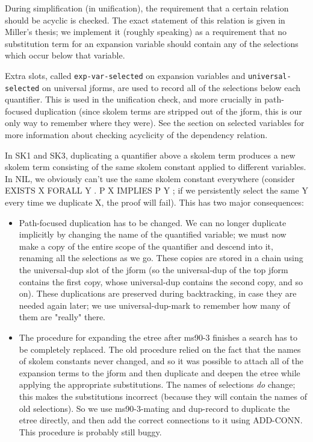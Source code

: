 During simplification (in unification), the requirement that a certain relation should be acyclic
is checked. The exact statement of this relation is given in Miller's thesis; we implement it
(roughly speaking) as a requirement that no substitution term for an expansion variable should 
contain any of the selections which occur below that variable.

Extra slots, called {\tt exp-var-selected} on expansion variables and {\tt universal-selected} on 
universal jforms, are used to record all of the 
selections below each quantifier. This is used in the unification check, and more crucially
in path-focused duplication (since skolem terms are stripped out of the jform, this is our only 
way to remember where they were).  See the section on selected variables for more information
about checking acyclicity of the dependency relation.

In SK1 and SK3, duplicating a quantifier above a skolem term produces a new skolem term 
consisting of the same skolem constant applied to different variables. In NIL, we obviously 
can't use the same skolem constant everywhere (consider EXISTS X FORALL Y . P X IMPLIES P Y ; 
if we persistently select the same Y every time we duplicate X, the proof will fail). This 
has two major consequences:

\begin{itemize}
\item Path-focused duplication has to be changed. We can no longer duplicate implicitly by changing the
name of the quantified variable; we must now make a copy of the entire scope of the 
quantifier and descend into it, renaming all the selections as we go. These copies are stored
in a chain using the universal-dup slot of the jform (so the universal-dup of the top jform
contains the first copy, whose universal-dup contains the second copy, and so on). These
duplications are preserved during backtracking, in case they are needed again later; we 
use universal-dup-mark to remember how many of them are "really" there.

\item The procedure for expanding the etree after ms90-3 finishes a search has to be completely
replaced. The old procedure relied on the fact that the names of skolem constants never changed,
and so it was possible to attach all of the expansion terms to the jform and then duplicate and
deepen the etree while applying the appropriate substitutions. The names of selections {\it do}
change; this makes the substitutions incorrect (because they will contain the names of old selections).
So we use ms90-3-mating and dup-record to duplicate the etree directly, and then add the
correct connections to it using ADD-CONN. This procedure is probably still buggy.
\end{itemize}

